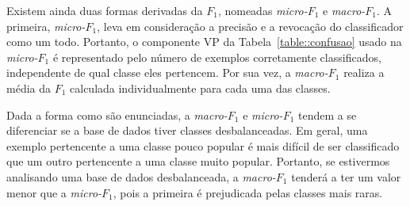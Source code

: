 Existem ainda duas formas derivadas da $F_1$, nomeadas \textit{micro-$F_1$} e \textit{macro-$F_1$}. A primeira, \textit{micro-$F_1$}, leva em consideração a precisão e a revocação do classificador como um todo. 
Portanto, o componente VP da Tabela~\ref{table::confusao} usado na \textit{micro-$F_1$} é representado pelo número de exemplos corretamente classificados, independente de qual classe eles pertencem.
Por sua vez, a \textit{macro-$F_1$} realiza a média da $F_1$ calculada individualmente para cada uma das classes. 

Dada a forma como são enunciadas, a \textit{macro-$F_1$} e \textit{micro-$F_1$} tendem a se diferenciar se a base de dados tiver classes desbalanceadas. Em geral, uma exemplo pertencente a uma classe pouco popular é mais difícil de ser classificado que um outro pertencente a uma classe muito popular. Portanto, se estivermos analisando uma base de dados desbalanceada, a \textit{macro-$F_1$} tenderá a ter um valor menor que a \textit{micro-$F_1$}, pois a primeira é prejudicada pelas classes mais raras. 


